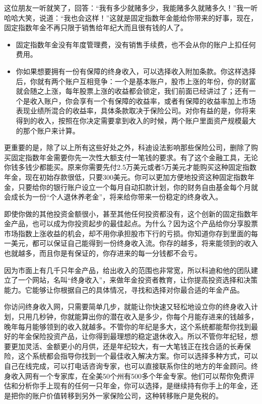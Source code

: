 这位朋友一听就笑了，回答：“我有多少就赌多少，我能赌多久就赌多久！”我一听哈哈大笑，说道：“我也会这样！”这就是固定指数年金能给你带来的好事，现在，固定指数年金不再只限于销售给年纪大而且很有钱的人了。

\begin{itemize}
\item 固定指数年金没有年度管理费，没有销售手续费，也不会从你的账户上扣任何费用。
\item 你如果想要拥有一份有保障的终身收入，可以选择收入附加条款。你这样选择后，你就有两个账户互相竞争：一个是基本账户，股市上涨的年份，你的财富就会随之上涨，每年股票上涨的收益都会锁定，我们前面已经讲过了；还有一个是收入账户，你会享有一个有保障的收益率，或者有保障的收益率加上市场表现业绩所混合的收益率，具体条款取决于保险公司。对你有益的是，你将来得到的收入，按照在你决定需要拿到收入的时候，两个账户里面资产规模最大的那个账户来计算。
\end{itemize}

更重要的是，除了以上所有这些好处之外，科迪设法影响那些保险公司，删除了购买固定指数年金需要你先一次性大额支付一笔钱的要求。有了这个金融工具，无论你钱多钱少都能买。原来你需要先付2.5万美元或者5万美元才能购买这种固定指数年金，现在初始存款很低，只要300美元。你可以更加方便地投资这种固定指数年金，只要给你的银行账户设立一个每月自动扣款计划，你的财务自由基金每个月就会成长为一份“个人退休养老金”，将来给你带来一份稳定的终身收入。

即使你做的其他投资金额很小，甚至其他任何投资都没有，这个创新的固定指数年金产品，也可以成为你投资起步的最佳起点。为什么？因为这个产品给你分享股票市场指数上涨收益的机会，却不用你承担股市下行的亏损。你知道你存到里面的每一美元，都可以保证自己能得到一份终身收入流。你存的越多，将来能领到的收入也就越多，而且你是有保证的，你存进来的每一分钱都不会亏。

因为市面上有几千只年金产品，给出收入的范围也非常宽，所以科迪和他的团队建立了一个网站，名叫“终身收入”，来做年金投资者教育，让你提高投资选择和决策能力。它能够让你根据自己的具体情况，寻找和选择对你最合适的年金产品。

你访问终身收入网，只需要简单几步，就能让你快速又轻松地设立你的终身收入计划，只用几秒钟，你就能算出你的潜在收入是多少，你每个月能存进来的钱越多，晚年每月能够领到的收入就越多。不管你的年纪是多大，这个系统都能帮你找到最好的年金保险投资产品，让你得到最理想的稳定退休收入。所以不管你年纪轻，想要更加灵活、金额更小的月供，还是年纪较大，有一大笔钱正在找合适的长寿保险，这个系统都会指导你找到一个最佳收入解决方案。你可以选择多种方式，可以自己在线完成，可以打电话咨询专家，也可以直接联系你住的地方的年金顾问。终身收入网有一个专家库，在全美50个州有500多个年金专家。他们可以帮你免费评估和分析你手上现有的任何一只年金，你可以选择，是继续持有你手上的年金，还是把你的账户价值转移到另外一家保险公司，这种转移账户是免税的。

